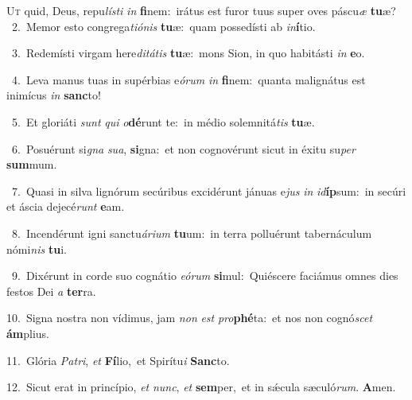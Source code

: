 \lettrine{\initial\textcolor{\initialcolor}{U}}{t} quid, Deus, repu\-\textit{lís}\-\textit{ti} \textit{in} \textbf{fi}\-nem:~\star irátus est furor tuus super oves páscu\textit{æ} \textbf{tu}\-æ?\\
{\numbfont\textcolor{\numbcolor}{~2.}}~Memor esto congrega\-\textit{ti}\-\textit{ó}\textit{nis} \textbf{tu}\-æ:~\star quam possedísti ab \textit{in}\-\textbf{í}tio.\par
{\numbfont\textcolor{\numbcolor}{~3.}}~Redemísti virgam here\-\textit{di}\-\textit{tá}\textit{tis} \textbf{tu}\-æ:~\star mons Sion, in quo habitásti \textit{in} \textbf{e}\-o.\par
{\numbfont\textcolor{\numbcolor}{~4.}}~Leva manus tuas in supérbias e\-\textit{ó}\-\textit{rum} \textit{in} \textbf{fi}\-nem:~\star quanta malignátus est inimícus \textit{in} \textbf{sanc}\-to!\par
{\numbfont\textcolor{\numbcolor}{~5.}}~Et gloriáti \textit{sunt} \textit{qui} \textit{o}\-\textbf{dé}runt te:~\star in médio solemnitá\textit{tis} \textbf{tu}\-æ.\par
{\numbfont\textcolor{\numbcolor}{~6.}}~Posuérunt si\textit{gna} \textit{su}\-\textit{a}, \textbf{si}\-gna:~\star et non cognovérunt sicut in éxitu su\textit{per} \textbf{sum}\-mum.\par
{\numbfont\textcolor{\numbcolor}{~7.}}~Quasi in silva lignórum secúribus excidérunt jánuas e\textit{jus} \textit{in} \textit{id}\-\textbf{íp}sum:~\star in secúri et áscia dejecé\textit{runt} \textbf{e}\-am.\par
{\numbfont\textcolor{\numbcolor}{~8.}}~Incendérunt igni sanctu\-\textit{á}\-\textit{ri}\textit{um} \textbf{tu}\-um:~\star in terra polluérunt tabernáculum nómi\textit{nis} \textbf{tu}\-i.\par
{\numbfont\textcolor{\numbcolor}{~9.}}~Dixérunt in corde suo cognátio \textit{e}\-\textit{ó}\textit{rum} \textbf{si}\-mul:~\star Quiéscere faciámus omnes dies festos Dei \textit{a} \textbf{ter}\-ra.\par
{\numbfont\textcolor{\numbcolor}{10.}}~Signa nostra non vídimus, jam \textit{non} \textit{est} \textit{pro}\-\textbf{phé}ta:~\star et nos non cognó\textit{scet} \textbf{ám}\-plius.\par
{\numbfont\textcolor{\numbcolor}{11.}}~Glória \textit{Pa}\-\textit{tri}, \textit{et} \textbf{Fí}\-lio,~\star et Spirítu\textit{i} \textbf{Sanc}\-to.\par
{\numbfont\textcolor{\numbcolor}{12.}}~Sicut erat in princípio, \textit{et} \textit{nunc}\-, \textit{et} \textbf{sem}\-per,~\star et in sǽcula sæculó\-\textit{rum}\-. \textbf{A}\-men.\par
